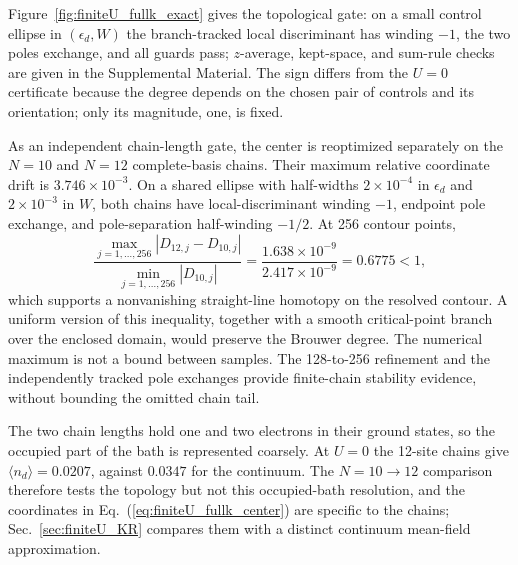 \documentclass[%
  aps,physrev,onecolumn,10pt,amsmath,amssymb,superscriptaddress,longbibliography,floatfix
]{revtex4-2}
\begin{document}
Figure~\ref{fig:finiteU_fullk_exact} gives the topological gate: on a small
control ellipse in $(\epsilon_d,W)$ the branch-tracked local discriminant has
winding $-1$, the two poles exchange, and all guards pass; $z$-average,
kept-space, and sum-rule checks are given in the Supplemental Material.  The
sign differs from the $U=0$ certificate because the degree depends on the
chosen pair of controls and its orientation; only its magnitude, one, is
fixed.

As an independent chain-length gate, the center is reoptimized separately
on the $N=10$ and $N=12$ complete-basis chains.  Their maximum relative
coordinate drift is $3.746\times10^{-3}$.  On a shared ellipse with
half-widths $2\times10^{-4}$ in $\epsilon_d$ and $2\times10^{-3}$ in $W$,
both chains have local-discriminant winding $-1$, endpoint pole exchange,
and pole-separation half-winding $-1/2$.  At 256 contour points,
\begin{equation}
\frac{\max_{j=1,\ldots,256}|D_{12,j}-D_{10,j}|}
{\min_{j=1,\ldots,256}|D_{10,j}|}
=\frac{1.638\times10^{-9}}{2.417\times10^{-9}}
=0.6775<1,
\label{eq:finiteU_fullk_rouche}
\end{equation}
which supports a nonvanishing straight-line homotopy on the resolved
contour.  A uniform version of this inequality, together with a smooth
critical-point branch over the enclosed domain, would preserve the Brouwer
degree.  The numerical maximum is not a bound between samples.  The
128-to-256 refinement and the independently tracked pole exchanges provide
finite-chain stability evidence, without bounding the omitted chain tail.

The two chain lengths hold one and two electrons in their ground states, so
the occupied part of the bath is represented coarsely.  At $U=0$ the 12-site
chains give $\langle n_d\rangle=0.0207$, against $0.0347$ for the continuum.
The $N=10\to12$ comparison therefore tests the topology but not this
occupied-bath resolution, and the coordinates in
Eq.~(\ref{eq:finiteU_fullk_center}) are specific to the chains;
Sec.~\ref{sec:finiteU_KR} compares them with a distinct continuum
mean-field approximation.
\end{document}
